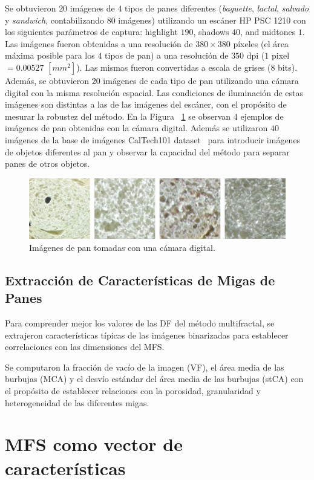 Se obtuvieron $20$ imágenes de $4$ tipos de panes diferentes ({\em baguette}, {\em lactal}, {\em salvado} y {\em sandwich}, contabilizando $80$ imágenes) utilizando un escáner HP PSC 1210 con los siguientes parámetros de captura:  highlight $190$, shadows $40$, and midtones $1$.
Las imágenes fueron obtenidas a una resolución de $380\times 380$ píxeles (el área máxima posible para los $4$ tipos de pan) a una resolución de $350$ dpi ($1$ pixel $= 0.00527$ $[mm^{2}]$).
Las mismas fueron convertidas a escala de grises ($8$ bits).
Además, se obtuvieron $20$ imágenes de cada tipo de pan utilizando una cámara digital con la misma resolución espacial.
Las condiciones de iluminación de estas imágenes son distintas a las de las imágenes del escáner, con el propósito de mesurar la robustez del método.
En la Figura ~\ref{fig:camera} se observan $4$ ejemplos de imágenes de pan obtenidas con la cámara digital. Además se utilizaron $40$ imágenes de la base de imágenes CalTech101 dataset~\cite{FeiFei04} para introducir imágenes de objetos diferentes al pan y observar la capacidad del método para separar panes de otros objetos.

\begin{figure}[h!]
\centering
\includegraphics[width=13cm]{pancamara}
\caption{Imágenes de pan tomadas con una cámara digital.}
\label{fig:camera}
\end{figure}

\subsection{Extracción de Características de Migas de Panes}
Para comprender mejor los valores de las DF del método multifractal, se extrajeron características típicas de las imágenes binarizadas para establecer correlaciones con las dimensiones del MFS.

Se computaron la fracción de vacío de la imagen (\acrshort{VF}), el área media de las burbujas (\acrshort{MCA}) y el desvío estándar del área media de las burbujas (\acrshort{stCA}) con el propósito de establecer relaciones con la porosidad, granularidad y heterogeneidad de las diferentes migas.


\section{MFS como vector de características}

